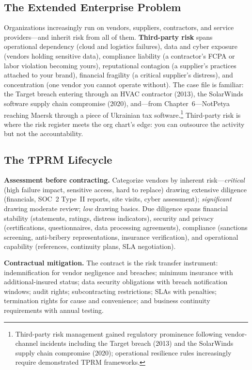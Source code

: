 \documentclass[11pt,openany]{book}
\begin{document}
\subsection{The Extended Enterprise Problem}

Organizations increasingly run on vendors, suppliers, contractors, and
service providers---and inherit risk from all of them. \textbf{Third-party
risk} spans operational dependency (cloud and logistics failures), data and
cyber exposure (vendors holding sensitive data), compliance liability (a
contractor's FCPA or labor violation becoming yours), reputational contagion
(a supplier's practices attached to your brand), financial fragility (a
critical supplier's distress), and concentration (one vendor you cannot
operate without). The case file is familiar: the Target breach entering
through an HVAC contractor (2013), the SolarWinds software supply chain
compromise (2020), and---from Chapter~6---NotPetya reaching Maersk through a
piece of Ukrainian tax software.\footnote{Third-party risk management gained
regulatory prominence following vendor-channel incidents including the Target
breach (2013) and the SolarWinds supply chain compromise (2020); operational
resilience rules increasingly require demonstrated TPRM frameworks.}
Third-party risk is where the risk register meets the org chart's edge: you
can outsource the activity but not the accountability.

\subsection{The TPRM Lifecycle}

\textbf{Assessment before contracting.} Categorize vendors by inherent
risk---\emph{critical} (high failure impact, sensitive access, hard to
replace) drawing extensive diligence (financials, SOC~2 Type~II reports, site
visits, cyber assessment); \emph{significant} drawing moderate review;
\emph{low} drawing basics. Due diligence spans financial stability
(statements, ratings, distress indicators), security and privacy
(certifications, questionnaires, data processing agreements), compliance
(sanctions screening, anti-bribery representations, insurance verification),
and operational capability (references, continuity plans, SLA negotiation).

\textbf{Contractual mitigation.} The contract is the risk transfer
instrument: indemnification for vendor negligence and breaches; minimum
insurance with additional-insured status; data security obligations with
breach notification windows; audit rights; subcontracting restrictions; SLAs
with penalties; termination rights for cause and convenience; and business
continuity requirements with annual testing.
\end{document}
